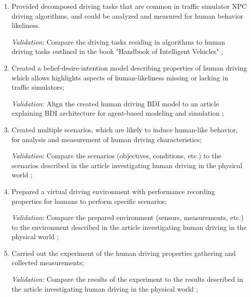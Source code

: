 \documentclass{VUMIFPS-master-intro}
\begin{document}
\begin{enumerate}
	\item Provided decomposed driving tasks that are common in traffic 
	simulator NPC driving algorithms, and could be analyzed and measured for 
	human behavior likeliness.
	
	\textit{Validation}: Compare the driving tasks residing in algorithms to 
	human driving tasks outlined in the book "Handbook of Intelligent Vehicles" 
	\cite{Eskandarian2017};


	\item Created a belief-desire-intention model describing properties of 
	human driving which allows highlights aspects of human-likeliness missing 
	or lacking in traffic simulators;
	
	\textit{Validation}: Align the created human driving BDI model to an 
	article explaining BDI architecture for agent-based modeling and simulation 
	\cite{Caillou2017};
	
	
	\item Created multiple scenarios, which are likely to induce human-like 
	behavior, for analysis and measurement of human driving characteristics;
	
	\textit{Validation}: Compare the scenarios (objectives, conditions, etc.) 
	to the scenarios described in the article investigating human driving in the
	physical world \cite{Blaszczyk2015};
	
	
	\item Prepared a virtual driving environment with performance recording 
	properties for humans to perform specific scenarios;
	
	\textit{Validation}: Compare the prepared environment (sensors, 
	measurements, etc.) to the environment described in the article 
	investigating human driving in the physical world \cite{Blaszczyk2015};


	\item Carried out the experiment of the human driving properties gathering 
	and collected measurements;
	
	\textit{Validation}: Compare the results of the experiment to the results 
	described in the article investigating human driving in the physical world 
	\cite{Blaszczyk2015};
	

\end{enumerate}
\end{document}
